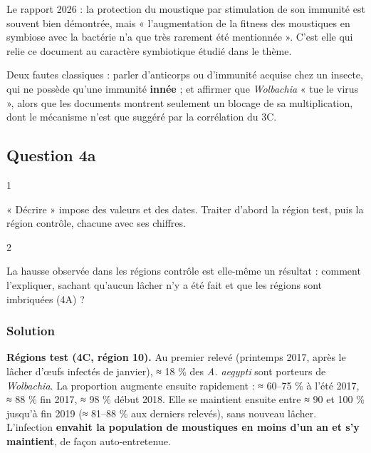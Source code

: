 \documentclass[11pt,a4paper]{article}
\begin{document}
\begin{jury}

Le rapport 2026 : la protection du moustique par stimulation de son immunité est souvent bien démontrée, mais « l'augmentation de la fitness des moustiques en symbiose avec la bactérie n'a que très rarement été mentionnée ». C'est elle qui relie ce document au caractère symbiotique étudié dans le thème.

\end{jury}

\begin{piege}

Deux fautes classiques : parler d'anticorps ou d'immunité acquise chez un insecte, qui ne possède qu'une immunité \textbf{innée} ; et affirmer que \emph{Wolbachia} « tue le virus », alors que les documents montrent seulement un blocage de sa multiplication, dont le mécanisme n'est que suggéré par la corrélation du 3C.

\end{piege}

\hypertarget{question-4a}{%
\subsection{Question 4a}\label{question-4a}}

\begin{indication}{1}

« Décrire » impose des valeurs et des dates. Traiter d'abord la région test, puis la région contrôle, chacune avec ses chiffres.

\end{indication}

\begin{indication}{2}

La hausse observée dans les régions contrôle est elle-même un résultat : comment l'expliquer, sachant qu'aucun lâcher n'y a été fait et que les régions sont imbriquées (4A) ?

\end{indication}

\hypertarget{solution-49}{%
\subsubsection{Solution}\label{solution-49}}

\textbf{Régions test (4C, région 10).} Au premier relevé (printemps 2017, après le lâcher d'œufs infectés de janvier), ≈ 18 \% des \emph{A. aegypti} sont porteurs de \emph{Wolbachia}. La proportion augmente ensuite rapidement : ≈ 60--75 \% à l'été 2017, ≈ 88 \% fin 2017, ≈ 98 \% début 2018. Elle se maintient ensuite entre ≈ 90 et 100 \% jusqu'à fin 2019 (≈ 81--88 \% aux derniers relevés), sans nouveau lâcher. L'infection \textbf{envahit la population de moustiques en moins d'un an et s'y maintient}, de façon auto-entretenue.
\end{document}
